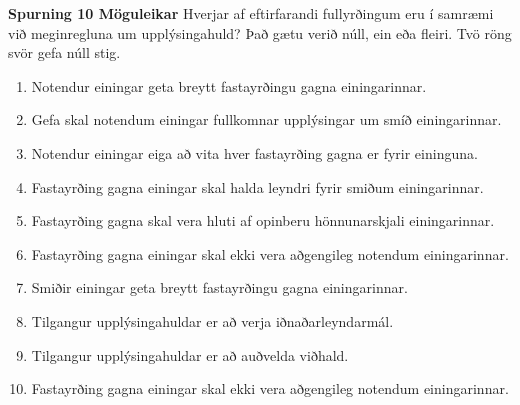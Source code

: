 \documentclass{article}
\newcommand{\bo}[1]{\textbf{#1}}
\newcommand{\enum}{\begin{enumerate}[label = \alph*.]}
\begin{document}
\bo{Spurning 10 Möguleikar}
Hverjar af eftirfarandi fullyrðingum eru í samræmi við meginregluna
um upplýsingahuld? Það gætu verið núll, ein eða fleiri. Tvö röng
svör gefa núll stig.

\enum
\item Notendur einingar geta breytt fastayrðingu gagna
einingarinnar.
\item Gefa skal notendum einingar fullkomnar upplýsingar um smíð
einingarinnar.
\item Notendur einingar eiga að vita hver fastayrðing gagna er fyrir
eininguna.
\item Fastayrðing gagna einingar skal halda leyndri fyrir smiðum
einingarinnar.
\item Fastayrðing gagna skal vera hluti af opinberu hönnunarskjali
einingarinnar.
\item Fastayrðing gagna einingar skal ekki vera aðgengileg
notendum einingarinnar.
\item Smiðir einingar geta breytt fastayrðingu gagna einingarinnar.
\item Tilgangur upplýsingahuldar er að verja iðnaðarleyndarmál.
\item Tilgangur upplýsingahuldar er að auðvelda viðhald.
\item Fastayrðing gagna einingar skal ekki vera aðgengileg
notendum einingarinnar.

\end{enumerate}
\end{document}
